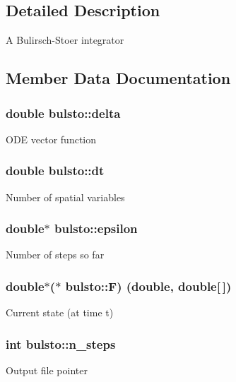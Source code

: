 \subsection{Detailed Description}
A Bulirsch-\/\+Stoer integrator 

\subsection{Member Data Documentation}
\hypertarget{structbulsto_a88b2a30854139fc04fd3763f78c1d97d}{}
\subsubsection[{delta}]{\setlength{\rightskip}{0pt plus 5cm}double bulsto\+::delta}\label{structbulsto_a88b2a30854139fc04fd3763f78c1d97d}
O\+D\+E vector function \hypertarget{structbulsto_a36056008e687384ae776b011c92a8536}{}
\subsubsection[{dt}]{\setlength{\rightskip}{0pt plus 5cm}double bulsto\+::dt}\label{structbulsto_a36056008e687384ae776b011c92a8536}
Number of spatial variables \hypertarget{structbulsto_a5b4eb1332886f1695feea32c643a9068}{}
\subsubsection[{epsilon}]{\setlength{\rightskip}{0pt plus 5cm}double$\ast$ bulsto\+::epsilon}\label{structbulsto_a5b4eb1332886f1695feea32c643a9068}
Number of steps so far \hypertarget{structbulsto_a8b6f5733863e9f0ce2179bc45a58902b}{}
\subsubsection[{F}]{\setlength{\rightskip}{0pt plus 5cm}double$\ast$($\ast$ bulsto\+::\+F) (double, double\mbox{[}$\,$\mbox{]})}\label{structbulsto_a8b6f5733863e9f0ce2179bc45a58902b}
Current state (at time t) \hypertarget{structbulsto_ab0f98110059509f36682188917a94e82}{}
\subsubsection[{n\+\_\+steps}]{\setlength{\rightskip}{0pt plus 5cm}int bulsto\+::n\+\_\+steps}\label{structbulsto_ab0f98110059509f36682188917a94e82}
Output file pointer \hypertarget{structbulsto_a1bd09226c3efbaec4baa7915682b9c40}{}
